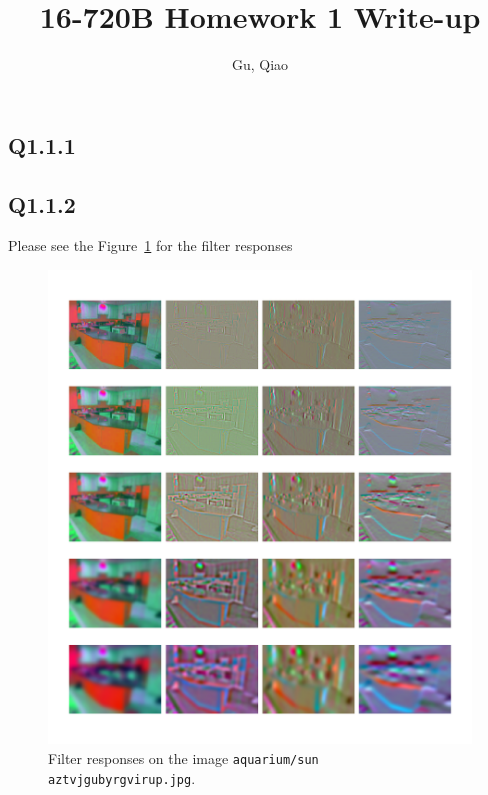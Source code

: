 \documentclass[11pt]{article}
\newcommand{\code}[1]{\texttt{#1}}
\begin{document}
\author{Gu, Qiao}
\title{16-720B Homework 1 Write-up}
\maketitle

\medskip

\subsection*{Q1.1.1}

\newpage

\subsection*{Q1.1.2}

Please see the Figure~\ref{fig:q1.1.2} for the filter responses

\begin{figure}[h!]
    \centering
    \includegraphics[width=\linewidth]{../results/q1_1_2_responses.png}
    \caption{Filter responses on the image \code{aquarium/sun aztvjgubyrgvirup.jpg}. }
    \label{fig:q1.1.2}
\end{figure}
\end{document}

